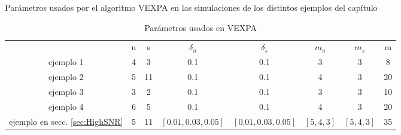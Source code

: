 Parámetros usados por el algoritmo VEXPA en las simulaciones de los distintos ejemplos del capítulo
\begin{table}[h!]
	\hspace{-1cm}
	\begin{tabular}{c|ccccccc}
		& u & s & $\delta_u$ & $\delta_s$ & $m_u$ & $m_s$ & m  \\ 
		ejemplo 1 & 4 & 3 & 0.1        & 0.1        &  3    & 3     & 8 \\
		ejemplo 2 & 5 & 11 & 0.1 & 0.1 & 4 & 3 & 20\\
		ejemplo 3 & 3 & 2 & 0.1 & 0.1 & 3 & 3 & 10\\
		ejemplo 4 & 6 & 5 & 0.1 & 0.1 & 4 & 3 & 20\\
		ejemplo en secc. \ref{sec:HighSNR} & 5 & 11 & $[0.01,0.03,0.05]$ & $[0.01,0.03,0.05]$ & $[5,4,3]$ & $[5,4,3]$ & 35\\
	\end{tabular}
	\caption{Parámetros usados en VEXPA}
	\label{tab:vexpa_parameters}
\end{table}

